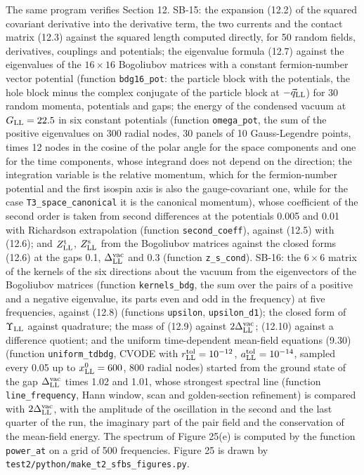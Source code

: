 \documentclass[
  10pt,
]{article}
\begin{document}
The same program verifies Section 12. SB-15: the expansion (12.2) of the
squared covariant derivative into the derivative term, the two currents
and the contact matrix (12.3) against the squared length computed
directly, for 50 random fields, derivatives, couplings and potentials;
the eigenvalue formula (12.7) against the eigenvalues of the
\(16\times16\) Bogoliubov matrices with a constant fermion-number vector
potential (function \texttt{bdg16\_pot}: the particle block with the
potentials, the hole block minus the complex conjugate of the particle
block at \(-\vec q_{\rm LL}\)) for 30 random momenta, potentials and
gaps; the energy of the condensed vacuum at \(G_{\rm LL}=22.5\) in six
constant potentials (function \texttt{omega\_pot}, the sum of the
positive eigenvalues on 300 radial nodes, 30 panels of 10 Gauss-Legendre
points, times 12 nodes in the cosine of the polar angle for the space
components and one for the time components, whose integrand does not
depend on the direction; the integration variable is the relative
momentum, which for the fermion-number potential and the first isospin
axis is also the gauge-covariant one, while for the case
\texttt{T3\_space\_canonical} it is the canonical momentum), whose
coefficient of the second order is taken from second differences at the
potentials 0.005 and 0.01 with Richardson extrapolation (function
\texttt{second\_coeff}), against (12.5) with (12.6); and
\(Z^{\rm t}_{\rm LL}\), \(Z^{\rm s}_{\rm LL}\) from the Bogoliubov
matrices against the closed forms (12.6) at the gaps 0.1,
\(\Delta^{\rm vac}_{\rm LL}\) and 0.3 (function \texttt{z\_s\_cond}).
SB-16: the \(6\times6\) matrix of the kernels of the six directions
about the vacuum from the eigenvectors of the Bogoliubov matrices
(function \texttt{kernels\_bdg}, the sum over the pairs of a positive
and a negative eigenvalue, its parts even and odd in the frequency) at
five frequencies, against (12.8) (functions \texttt{upsilon},
\texttt{upsilon\_d1}); the closed form of \(\Upsilon_{\rm LL}\) against
quadrature; the mass of (12.9) against \(2\Delta^{\rm vac}_{\rm LL}\);
(12.10) against a difference quotient; and the uniform time-dependent
mean-field equations (9.30) (function \texttt{uniform\_tdbdg}, CVODE
with \(r^{\rm tol}_{\rm LL}=10^{-12}\),
\(a^{\rm tol}_{\rm LL}=10^{-14}\), sampled every 0.05 up to
\(x^0_{\rm LL}=600\), 800 radial nodes) started from the ground state of
the gap \(\Delta^{\rm vac}_{\rm LL}\) times 1.02 and 1.01, whose
strongest spectral line (function \texttt{line\_frequency}, Hann window,
scan and golden-section refinement) is compared with
\(2\Delta^{\rm vac}_{\rm LL}\), with the amplitude of the oscillation in
the second and the last quarter of the run, the imaginary part of the
pair field and the conservation of the mean-field energy. The spectrum
of Figure 25(e) is computed by the function \texttt{power\_at} on a grid
of 500 frequencies. Figure 25 is drawn by
\texttt{test2/python/make\_t2\_sfbs\_figures.py}.
\end{document}
